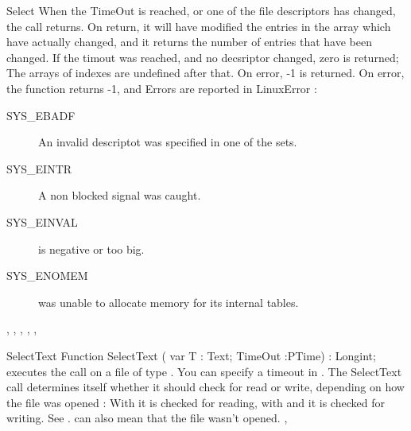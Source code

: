 \begin{function}{Select}
When the TimeOut is reached, or one of the file descriptors has changed,
the  call returns. On return, it will have modified the entries
in the array which have actually changed, and it returns the number of
entries that have been changed. If the timout was reached, and no decsriptor
changed, zero is returned; The arrays of indexes are undefined after that.
On error, -1 is returned.
\Errors
On error, the function returns -1, and Errors are reported in LinuxError :
\begin{description}
\item[SYS\_EBADF\ ] An invalid descriptot was specified in one of the sets.
\item[SYS\_EINTR\ ] A non blocked signal was caught.
\item[SYS\_EINVAL\ ]   is negative or too big.
\item[SYS\_ENOMEM\ ]  was unable to allocate memory for its 
 internal tables.
\end{description}
\SeeAlso
{}, , 
,
,
, 
\end{function}


\begin{function}{SelectText}
\Declaration
Function SelectText ( var T : Text; TimeOut :PTime) : Longint;
\Description
{} executes the  call on a file of type
. You can specify a timeout in . The SelectText call
determines itself whether it should check for read or write, depending on
how the file was opened : With  it is checked for reading, with
 and  it is checked for writing.
\Errors
See .  can also mean that the file wasn't
opened.
\SeeAlso
{}, 
\end{function}

